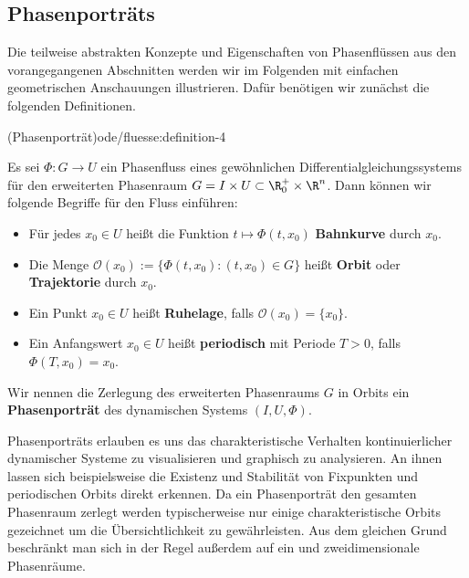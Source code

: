 \documentclass[letterpaper,10pt,german]{jupyterBook}
\begin{document}
\subsection{Phasenporträts}
\label{\detokenize{ode/fluesse:phasenportrats}}
\par
Die teilweise abstrakten Konzepte und Eigenschaften von Phasenflüssen aus den vorangegangenen Abschnitten werden wir im Folgenden mit einfachen geometrischen Anschauungen illustrieren.
Dafür benötigen wir zunächst die folgenden Definitionen.
\begin{definition}{(Phasenporträt)}{ode/fluesse:definition-4}



\par
Es sei \(\Phi:G\rightarrow U\) ein Phasenfluss eines gewöhnlichen Differentialgleichungssystems für den erweiterten Phasenraum \(G = I \times U\subset \R^+_0\times \R^n\).
Dann können wir folgende Begriffe für den Fluss einführen:
\begin{itemize}
\item {} 
\par
Für jedes \(x_0\in U\) heißt die Funktion \(t\mapsto \Phi(t, x_0)\) \textbf{Bahnkurve} durch \(x_0\).

\item {} 
\par
Die Menge \(\mathcal{O}(x_0) := \{\Phi(t, x_0): (t, x_0)\in G\}\) heißt \textbf{Orbit} oder \textbf{Trajektorie} durch \(x_0\).

\item {} 
\par
Ein Punkt \(x_0 \in U\) heißt \textbf{Ruhelage}, falls \(\mathcal{O}(x_0) = \{x_0\}\).

\item {} 
\par
Ein Anfangswert \(x_0\in U\) heißt \textbf{periodisch} mit Periode \(T>0\), falls \(\Phi(T, x_0) = x_0\).

\end{itemize}

\par
Wir nennen die Zerlegung des erweiterten Phasenraums \(G\) in Orbits ein \textbf{Phasenporträt} des dynamischen Systems \((I,U, \Phi)\).
\end{definition}

\par
Phasenporträts erlauben es uns das charakteristische Verhalten kontinuierlicher dynamischer Systeme zu visualisieren und graphisch zu analysieren.
An ihnen lassen sich beispielsweise die Existenz und Stabilität von Fixpunkten und periodischen Orbits direkt erkennen.
Da ein Phasenporträt den gesamten Phasenraum zerlegt werden typischerweise nur einige charakteristische Orbits gezeichnet um die Übersichtlichkeit zu gewährleisten.
Aus dem gleichen Grund beschränkt man sich in der Regel außerdem auf ein  und zweidimensionale Phasenräume.
\end{document}
